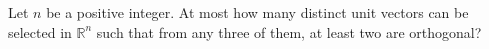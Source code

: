 Let \(n\) be a positive integer. At most how many distinct unit vectors can be selected in \(\mathbb{R}^n\) such that from any three of them, at least two are orthogonal?
